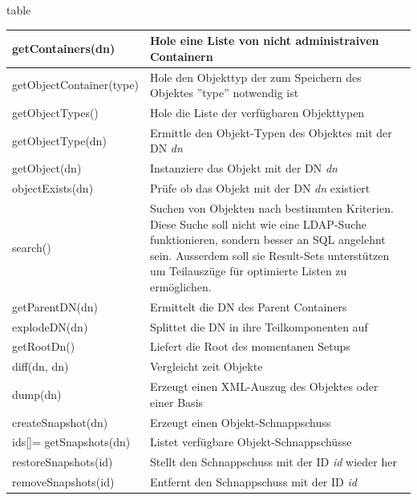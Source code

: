 \begin{nofloat}{table}
 \begin{center}
  \begin{tabularx}{\textwidth}[]{|X|X|}
   \hline
    getContainers(dn)         & Hole eine Liste von nicht administraiven Containern\\
   \hline
    getObjectContainer(type)  & Hole den Objekttyp der zum Speichern des Objektes ''type'' notwendig ist\\
   \hline
    getObjectTypes()          & Hole die Liste der verfügbaren Objekttypen\\
   \hline
    getObjectType(dn)         & Ermittle den Objekt-Typen des Objektes mit der DN \textit{dn}\\
   \hline
    getObject(dn)             & Instanziere das Objekt mit der DN \textit{dn}\\
   \hline
    objectExists(dn)          & Prüfe ob das Objekt mit der DN \textit{dn} existiert\\
   \hline
    search() & Suchen von Objekten nach bestimmten Kriterien. Diese Suche soll nicht wie eine LDAP-Suche funktionieren, sondern
           besser an SQL angelehnt sein. Ausserdem soll sie Result-Sets unterstützen um Teilauszüge für optimierte Listen zu
           ermöglichen.\\ 
   \hline
    getParentDN(dn)           & Ermittelt die DN des Parent Containers\\
   \hline
    explodeDN(dn)             & Splittet die DN in ihre Teilkomponenten auf\\
   \hline
    getRootDn()               & Liefert die Root des momentanen Setups\\
   \hline
    diff(dn, dn)              & Vergleicht zeit Objekte\\
   \hline
    dump(dn)                  & Erzeugt einen XML-Auszug des Objektes oder einer Basis\\
   \hline
    createSnapshot(dn)        & Erzeugt einen Objekt-Schnappschuss\\
    \hline
    ids[]= getSnapshots(dn)   & Listet verfügbare Objekt-Schnappschüsse\\
    \hline
    restoreSnapshots(id)      & Stellt den Schnappschuss mit der ID \textit{id} wieder her\\
    \hline
    removeSnapshots(id)       & Entfernt den Schnappschuss mit der ID \textit{id}\\
   \hline
  \end{tabularx}
 \end{center}
\end{nofloat}


